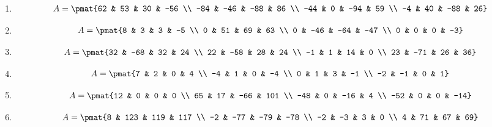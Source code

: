 \begin{enumerate}
\item

\begin{align*}
A = \pmat{62 & 53 & 30 & -56 \\ -84 & -46 & -88 & 86 \\ -44 & 0 & -94 & 59 \\ -4 & 40 & -88 & 26}
\end{align*}

\item

\begin{align*}
A = \pmat{8 & 3 & 3 & -5 \\ 0 & 51 & 69 & 63 \\ 0 & -46 & -64 & -47 \\ 0 & 0 & 0 & -3}
\end{align*}

\item

\begin{align*}
A = \pmat{32 & -68 & 32 & 24 \\ 22 & -58 & 28 & 24 \\ -1 & 1 & 14 & 0 \\ 23 & -71 & 26 & 36}
\end{align*}

\item

\begin{align*}
A = \pmat{7 & 2 & 0 & 4 \\ -4 & 1 & 0 & -4 \\ 0 & 1 & 3 & -1 \\ -2 & -1 & 0 & 1}
\end{align*}

\item

\begin{align*}
A = \pmat{12 & 0 & 0 & 0 \\ 65 & 17 & -66 & 101 \\ -48 & 0 & -16 & 4 \\ -52 & 0 & 0 & -14}
\end{align*}

\item

\begin{align*}
A = \pmat{8 & 123 & 119 & 117 \\ -2 & -77 & -79 & -78 \\ -2 & -3 & 3 & 0 \\ 4 & 71 & 67 & 69}
\end{align*}


\end{enumerate}
